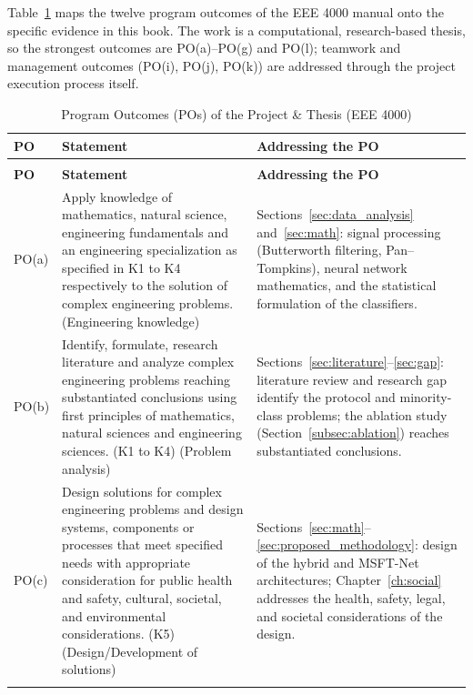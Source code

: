 Table~\ref{tab:po_mapping} maps the twelve program outcomes of the EEE 4000
manual onto the specific evidence in this book. The work is a
computational, research-based thesis, so the strongest outcomes are
PO(a)--PO(g) and PO(l); teamwork and management outcomes (PO(i), PO(j),
PO(k)) are addressed through the project execution process itself.
\begin{longtable}{@{}>{\raggedright\arraybackslash}p{0.55in}>{\raggedright\arraybackslash}p{3.1in}>{\raggedright\arraybackslash}p{1.5in}@{}}
\caption{Program Outcomes (POs) of the Project \& Thesis (EEE 4000)}
\label{tab:po_mapping} \\
\toprule
\textbf{PO} & \textbf{Statement} & \textbf{Addressing the PO} \\
\midrule
\endfirsthead
\multicolumn{3}{@{}l}{\small\textit{Table \thetable\ continued from the previous page}} \\
\toprule
\textbf{PO} & \textbf{Statement} & \textbf{Addressing the PO} \\
\midrule
\endhead
\bottomrule
\endfoot

PO(a) & Apply knowledge of mathematics, natural science, engineering
fundamentals and an engineering specialization as specified in K1 to K4
respectively to the solution of complex engineering problems.
(Engineering knowledge) & Sections~\ref{sec:data_analysis}
and~\ref{sec:math}: signal processing (Butterworth
filtering, Pan--Tompkins), neural network mathematics, and the statistical
formulation of the classifiers. \\
\addlinespace

PO(b) & Identify, formulate, research literature and analyze complex
engineering problems reaching substantiated conclusions using first
principles of mathematics, natural sciences and engineering sciences.
(K1 to K4) (Problem analysis) &
Sections~\ref{sec:literature}--\ref{sec:gap}: literature review and
research gap identify the protocol and minority-class problems; the
ablation study (Section~\ref{subsec:ablation}) reaches substantiated
conclusions. \\
\addlinespace

PO(c) & Design solutions for complex engineering problems and design
systems, components or processes that meet specified needs with appropriate
consideration for public health and safety, cultural, societal, and
environmental considerations. (K5) (Design/Development of solutions)
& Sections~\ref{sec:math}--\ref{sec:proposed_methodology}: design of the
hybrid and MSFT-Net architectures; Chapter~\ref{ch:social} addresses the
health, safety, legal, and societal considerations of the design. \\
\addlinespace


\end{longtable}
